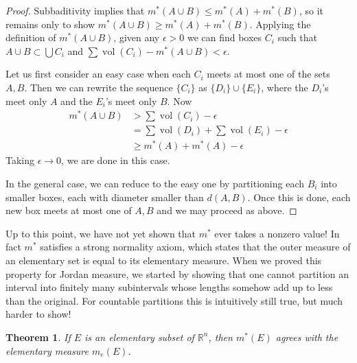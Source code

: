 \documentclass[11pt,oneside]{amsbook}
\newcommand{\RR}{{\mathbb R}}
\DeclareMathOperator{\vol}{vol}
\theoremstyle{definition}
\theoremstyle{plain}
\newtheorem{thm}{Theorem}[section]
\theoremstyle{definition}
\theoremstyle{remark}
\numberwithin{equation}{section}
\numberwithin{figure}{section}
\begin{document}
\begin{proof}
  Subbaditivity implies that $m^*(A\cup B)\leq m^*(A)+m^*(B)$, so it remains only to show $m^*(A\cup B)\geq m^*(A)+m^*(B)$. Applying the definition of $m^*(A\cup B)$, given any $\epsilon>0$ we can find boxes $C_i$ such that $A\cup B\subset\bigcup C_i$ and $\sum\vol(C_i)-m^*(A\cup B)<\epsilon$.

  Let us first consider an easy case when each $C_i$ meets at most one of the sets $A,B$. Then we can rewrite the sequence $\{C_i\}$ as $\{D_i\}\cup\{E_i\}$, where the $D_i$'s meet only $A$ and the $E_i$'s meet only $B$. Now
  \begin{align*}
    m^*(A\cup B)&>\sum\vol(C_i)-\epsilon\\
                &=\sum\vol(D_i)+\sum\vol(E_i)-\epsilon\\
                &\geq m^*(A)+m^*(A)-\epsilon
  \end{align*}
  Taking $\epsilon\to0$, we are done in this case.

  In the general case, we can reduce to the easy one by partitioning each $B_i$ into smaller boxes, each with diameter smaller than $d(A,B)$. Once this is done, each new box meets at most one of $A,B$ and we may proceed as above.
\end{proof}

Up to this point, we have not yet shown that $m^*$ ever takes a nonzero value! In fact $m^*$ satisfies a strong normality axiom, which states that the outer measure of an elementary set is equal to its elementary measure. When we proved this property for Jordan measure, we started by showing that one cannot partition an interval into finitely many subintervals whose lengths somehow add up to less than the original. For countable partitions this is intuitively still true, but much harder to show!

\begin{thm}
  If $E$ is an elementary subset of $\RR^n$, then $m^*(E)$ agrees with the elementary measure $m_e(E)$.
\end{thm}
\end{document}
